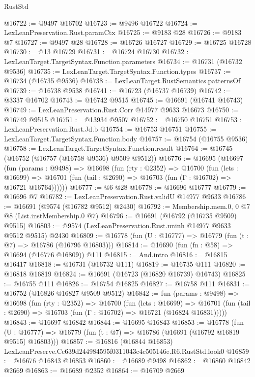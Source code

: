 \begin{lexlean}{RustStd}
\begin{coremodule}
@16722 := @9497 @16702
@16723 := @9496 @16722
@16724 := LexLeanPreservation.Rust.paramCtx
@16725 := @9183 @28
@16726 := @9183 @7
@16727 := @9497 @28
@16728 := @16726 @16727
@16729 := @16725 @16728
@16730 := @13 @16729
@16731 := @16724 @16730
@16732 := LexLeanTarget.TargetSyntax.Function.parameters
@16734 := @16731 (@16732 @9536)
@16735 := LexLeanTarget.TargetSyntax.Function.types
@16737 := @16734 (@16735 @9536)
@16738 := LexLeanTarget.RustSemantics.patternsOf
@16739 := @16738 @9538
@16741 := @16723 (@16737 @16739)
@16742 := @3337 @16702
@16743 := @16742 @9515
@16745 := @16691 (@16741 @16743)
@16749 := LexLeanPreservation.Rust.Corr @14977 @9633 @16673
@16750 := @16749 @9515
@16751 := @13934 @9507
@16752 := @16750 @16751
@16753 := LexLeanPreservation.Rust.Jd.b
@16754 := @16753 @16751
@16755 := LexLeanTarget.TargetSyntax.Function.body
@16757 := @16754 (@16755 @9536)
@16758 := LexLeanTarget.TargetSyntax.Function.result
@16764 := @16745 (@16752 (@16757 (@16758 @9536) @9509 @9512))
@16776 := @16695
    (@16697
      (fun (params : @9498) =>
      @16698
        (fun (rty : @2352) =>
        @16700
          (fun (lets : @16699) =>
          @16701 (fun (tail : @2690) => @16703 (fun (Γ : @16702) => @16721 @16764))))))
@16777 := @6 @28
@16778 := @16696 @16777
@16779 := @16696 @7
@16782 := LexLeanPreservation.Rust.validU @14977 @9633
@16786 := @16691 (@9574 (@16782 @9512) @2430)
@16792 := Membership.mem.{0, 0} @7 @8 (List.instMembership.{0} @7)
@16796 := @16691 (@16792 (@16735 @9509) @9515)
@16803 := @9574 (LexLeanPreservation.Rust.uninh @14977 @9633 @9512 @9515) @2430
@16809 := @16778 (fun (U : @16777) => @16779 (fun (t : @7) => @16786 (@16796 @16803)))
@16814 := @16690 (fun (fn : @58) => @16694 (@16776 @16809)) @111
@16815 := And.intro
@16816 := @16815 @16417
@16818 := @16731 (@16732 @111)
@16819 := @16735 @111
@16820 := @16818 @16819
@16824 := @16691 (@16723 (@16820 @16739) @16743)
@16825 := @16755 @111
@16826 := @16754 @16825
@16827 := @16758 @111
@16831 := @16752 (@16826 @16827 @9509 @9512)
@16842 := fun (params : @9498) =>
  @16698
    (fun (rty : @2352) =>
    @16700
      (fun (lets : @16699) =>
      @16701 (fun (tail : @2690) => @16703 (fun (Γ : @16702) => @16721 (@16824 @16831)))))
@16843 := @16697 @16842
@16844 := @16695 @16843
@16853 := @16778
    (fun (U : @16777) => @16779 (fun (t : @7) => @16786 (@16691 (@16792 @16819 @9515) @16803)))
@16857 := @16816 (@16844 @16853) LexLeanPreserve.Cc639d244984595f0311043c4c505146e.R6.RustStd.look0
@16859 := @16676 @16843 @16853
@16860 := @16689 @9498
@16862 := @16860 @16842 @2669
@16863 := @16689 @2352
@16864 := @16709 @2669

\end{coremodule}
\end{lexlean}

